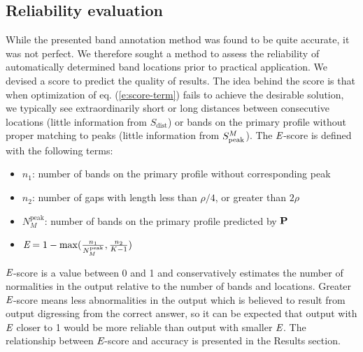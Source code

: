 \subsection{Reliability evaluation}\label{ss:reliability-evaluation}
While the presented band annotation method was found to be quite accurate, it was not perfect. We therefore sought a method to assess the reliability of automatically determined band locations prior to practical application. We devised a score to predict the quality of results. The idea behind the score is that when optimization of eq. (\ref{e:score-term}) fails to achieve the desirable solution, we typically see extraordinarily short or long distances between consecutive locations (little information from $S_\textrm{dist}$) or bands on the primary profile without proper matching to peaks (little information from $S^{{M}}_\textrm{peak}$). The ${\emph{E}}$-score is defined with the following terms:
\begin{itemize}
\item $n_1$: number of bands on the primary profile without corresponding peak
\item $n_2$: number of gaps with length less than $\rho/4$, or greater than $2\rho$
\item $N^\textrm{peak}_M$: number of bands on the primary profile predicted by ${\mathbf{P}}$
\item ${\emph{E}} = 1 - {\max({{n_1} \over N^\textrm{peak}_M}, {{n_2} \over {K-1}})}$
\end{itemize}
${\emph{E}}$-score is a value between 0 and 1 and conservatively estimates the number of normalities in the output relative to the number of bands and locations. Greater ${\emph{E}}$-score means less abnormalities in the output which is believed to result from output digressing from the correct answer, so it can be expected that output with ${\emph{E}}$ closer to 1 would be more reliable than output with smaller ${\emph{E}}$. The relationship between ${\emph{E}}$-score and accuracy is presented in the Results section.

